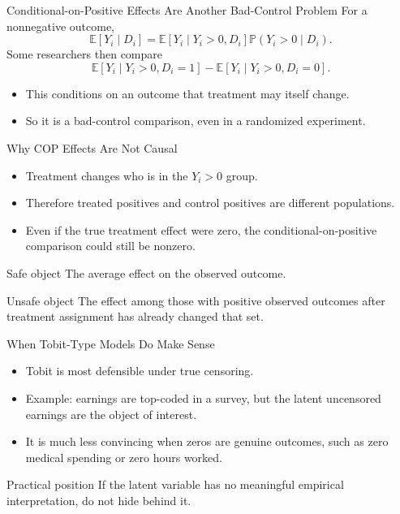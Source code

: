 \documentclass[11pt,aspectratio=169]{beamer}
\newcommand{\E}{\mathbb{E}}
\newcommand{\Prob}{\mathbb{P}}
\newcommand{\derivbutton}[1]{\vspace{0.4em}\hfill\hyperlink{app:#1}{\beamerbutton{Appendix details}}}
\begin{document}
\begin{frame}{Conditional-on-Positive Effects Are Another Bad-Control Problem}
  \hypertarget{main:cop}{}
  For a nonnegative outcome,
  \[
    \E[Y_i \mid D_i]
    =
    \E[Y_i \mid Y_i>0,D_i]\Prob(Y_i>0 \mid D_i).
  \]
  Some researchers then compare
  \[
    \E[Y_i \mid Y_i>0,D_i=1]-\E[Y_i \mid Y_i>0,D_i=0].
  \]
  \begin{itemize}
    \item This conditions on an outcome that treatment may itself change.
    \item So it is a bad-control comparison, even in a randomized experiment.
  \end{itemize}
  \derivbutton{cop-proof}
\end{frame}

\begin{frame}{Why COP Effects Are Not Causal}
  \begin{itemize}
    \item Treatment changes who is in the \(Y_i>0\) group.
    \item Therefore treated positives and control positives are different populations.
    \item Even if the true treatment effect were zero, the conditional-on-positive comparison could still be nonzero.
  \end{itemize}
  \begin{block}{Safe object}
    The average effect on the observed outcome.
  \end{block}
  \begin{block}{Unsafe object}
    The effect among those with positive observed outcomes after treatment assignment has already changed that set.
  \end{block}
\end{frame}

\begin{frame}{When Tobit-Type Models Do Make Sense}
  \begin{itemize}
    \item Tobit is most defensible under true censoring.
    \item Example: earnings are top-coded in a survey, but the latent uncensored earnings are the object of interest.
    \item It is much less convincing when zeros are genuine outcomes, such as zero medical spending or zero hours worked.
  \end{itemize}
  \begin{block}{Practical position}
    If the latent variable has no meaningful empirical interpretation, do not hide behind it.
  \end{block}
\end{frame}
\end{document}
